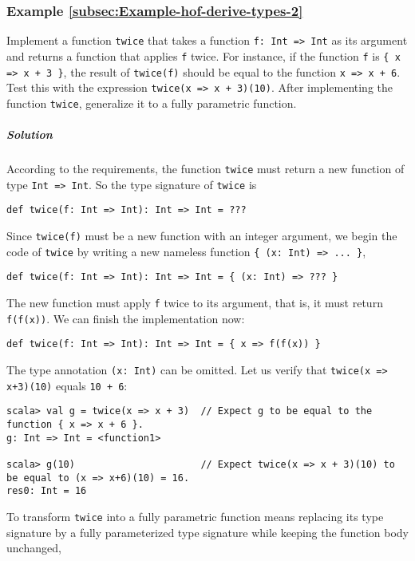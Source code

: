 \subsubsection{Example \label{subsec:Example-hof-derive-types-2}\ref{subsec:Example-hof-derive-types-2}}

Implement a function \lstinline!twice! that takes a function \lstinline!f: Int => Int!
as its argument and returns a function that applies \lstinline!f!
twice. For instance, if the function \lstinline!f! is \lstinline!{ x => x + 3 }!,
the result of \lstinline!twice(f)! should be equal to the function
\lstinline!x => x + 6!. Test this with the expression \lstinline!twice(x => x + 3)(10)!.
After implementing the function \lstinline!twice!, generalize it
to a fully parametric function.

\subparagraph{Solution}

According to the requirements, the function \lstinline!twice! must
return a new function of type \lstinline!Int => Int!. So the type
signature of \lstinline!twice! is
\begin{lstlisting}
def twice(f: Int => Int): Int => Int = ???
\end{lstlisting}
Since \lstinline!twice(f)! must be a new function with an integer
argument, we begin the code of \lstinline!twice! by writing a new
nameless function \lstinline!{ (x: Int) => ... }!,
\begin{lstlisting}
def twice(f: Int => Int): Int => Int = { (x: Int) => ??? }
\end{lstlisting}
The new function must apply \lstinline!f! twice to its argument,
that is, it must return \lstinline!f(f(x))!. We can finish the implementation
now:
\begin{lstlisting}
def twice(f: Int => Int): Int => Int = { x => f(f(x)) }
\end{lstlisting}
The type annotation \lstinline!(x: Int)! can be omitted. Let us verify
that \lstinline!twice(x => x+3)(10)! equals \lstinline!10 + 6!:
\begin{lstlisting}
scala> val g = twice(x => x + 3)  // Expect g to be equal to the function { x => x + 6 }.
g: Int => Int = <function1>

scala> g(10)                      // Expect twice(x => x + 3)(10) to be equal to (x => x+6)(10) = 16.
res0: Int = 16
\end{lstlisting}

To transform \lstinline!twice! into a fully parametric function means
replacing its type signature by a fully parameterized type signature
while keeping the function body unchanged,

